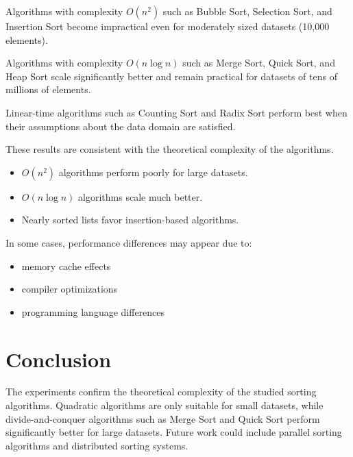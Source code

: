 \documentclass[12pt]{article}
\begin{document}
Algorithms with complexity $O(n^2)$ such as Bubble Sort, Selection Sort, and Insertion Sort become impractical even for moderately sized datasets (10,000 elements).

Algorithms with complexity $O(n \log n)$ such as Merge Sort, Quick Sort, and Heap Sort scale significantly better and remain practical for datasets of tens of millions of elements.

Linear-time algorithms such as Counting Sort and Radix Sort perform best when their assumptions about the data domain are satisfied.

These results are consistent with the theoretical complexity of the algorithms.

\begin{itemize}
\item $O(n^2)$ algorithms perform poorly for large datasets.
\item $O(n \log n)$ algorithms scale much better.
\item Nearly sorted lists favor insertion-based algorithms.
\end{itemize}

In some cases, performance differences may appear due to:

\begin{itemize}
\item memory cache effects
\item compiler optimizations
\item programming language differences
\end{itemize}

\section{Conclusion}

The experiments confirm the theoretical complexity of the studied sorting algorithms.  
Quadratic algorithms are only suitable for small datasets, while divide-and-conquer 
algorithms such as Merge Sort and Quick Sort perform significantly better for large datasets.
Future work could include parallel sorting algorithms and distributed sorting systems.
\end{document}
